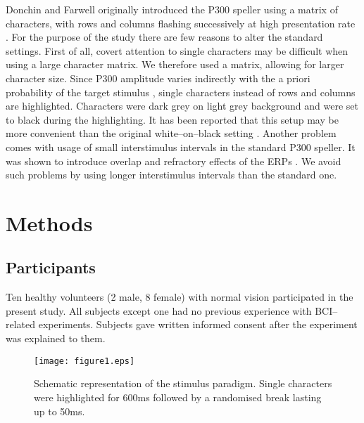 \documentclass[a4paper,twocolumn]{article}
\begin{document}
Donchin and Farwell originally introduced the P300 speller using a  matrix of characters, with rows and columns flashing successively at high presentation rate \cite{Farwell1988}. For the purpose of the study there are few reasons to alter the standard settings. First of all, covert attention to single characters may be difficult when using a large character matrix. We therefore used a  matrix, allowing for larger character size. Since P300 amplitude varies indirectly with the a priori probability of the target stimulus \cite{Duncan-JohnsonDonchin1977}, single characters instead of rows and columns are highlighted. Characters were dark grey on light grey background and were set to black during the highlighting. It has been reported that this setup may be more convenient than the original white--on--black setting \cite{Salvaris2009}. Another problem comes with usage of small interstimulus intervals in the standard P300 speller. It was shown to introduce overlap and refractory effects of the ERPs \cite{MartensEtAl2009}. We avoid such problems by using longer interstimulus intervals than the standard one.

\section*{Methods}
\subsection*{Participants}
Ten healthy volunteers (2 male, 8 female) with normal vision participated in the present study. All subjects except one had no previous experience with BCI--related experiments. Subjects gave written informed consent after the experiment was explained to them. \begin{figure}
\centering
\texttt{[image: figure1.eps]}
\caption{{Schematic representation of the stimulus paradigm.} Single characters were highlighted for 600ms followed by a randomised break lasting up to 50ms.}
\label{fig:stimulus_schema}
\end{figure}
\end{document}
